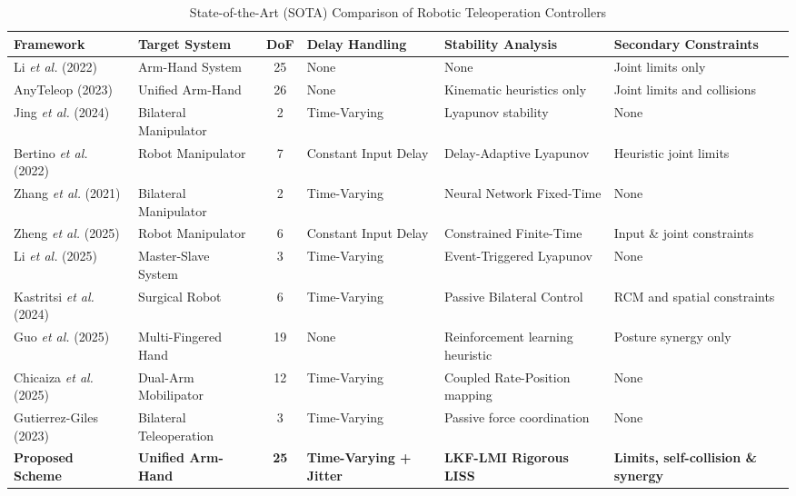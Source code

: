 \documentclass[letterpaper,journal]{IEEEtran}
\begin{document}
\begin{table}[t]
\centering
\caption{State-of-the-Art (SOTA) Comparison of Robotic Teleoperation Controllers}
\label{tab:sota}
\begin{tabular}{|l|l|c|l|l|l|}
\hline
\textbf{Framework} & \textbf{Target System} & \textbf{DoF} & \textbf{Delay Handling} & \textbf{Stability Analysis} & \textbf{Secondary Constraints} \\
\hline
Li \textit{et al.} (2022) \cite{ref_cybernetics_armhand} & Arm-Hand System & 25 & None & None & Joint limits only \\
AnyTeleop (2023) \cite{ref_anyteleop} & Unified Arm-Hand & 26 & None & Kinematic heuristics only & Joint limits and collisions \\
Jing \textit{et al.} (2024) \cite{ref_tase_tele} & Bilateral Manipulator & 2 & Time-Varying & Lyapunov stability & None \\
Bertino \textit{et al.} (2022) \cite{ref_tcst_delay} & Robot Manipulator & 7 & Constant Input Delay & Delay-Adaptive Lyapunov & Heuristic joint limits \\
Zhang \textit{et al.} (2021) \cite{ref_tcyb_nn} & Bilateral Manipulator & 2 & Time-Varying & Neural Network Fixed-Time & None \\
Zheng \textit{et al.} (2025) \cite{ref_tmech_manip} & Robot Manipulator & 6 & Constant Input Delay & Constrained Finite-Time & Input \& joint constraints \\
Li \textit{et al.} (2025) \cite{ref_tcyb_event} & Master-Slave System & 3 & Time-Varying & Event-Triggered Lyapunov & None \\
Kastritsi \textit{et al.} (2024) \cite{ref_tro_rcm} & Surgical Robot & 6 & Time-Varying & Passive Bilateral Control & RCM and spatial constraints \\
Guo \textit{et al.} (2025) \cite{ref_tro_grasp} & Multi-Fingered Hand & 19 & None & Reinforcement learning heuristic & Posture synergy only \\
Chicaiza \textit{et al.} (2025) \cite{ref_access_dual} & Dual-Arm Mobilipator & 12 & Time-Varying & Coupled Rate-Position mapping & None \\
Gutierrez-Giles (2023) \cite{ref_tcst_delayed_force} & Bilateral Teleoperation & 3 & Time-Varying & Passive force coordination & None \\
\textbf{Proposed Scheme} & \textbf{Unified Arm-Hand} & \textbf{25} & \textbf{Time-Varying + Jitter} & \textbf{LKF-LMI Rigorous LISS} & \textbf{Limits, self-collision \& synergy} \\
\hline
\end{tabular}
\end{table}
\end{document}
